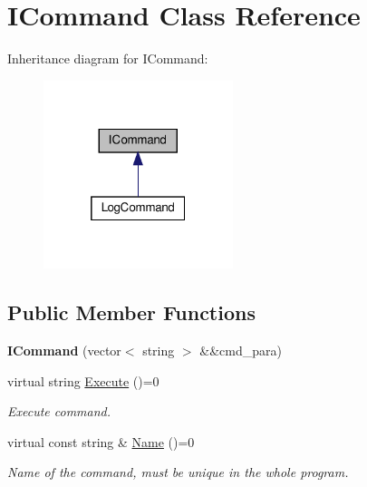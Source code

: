 \hypertarget{classICommand}{}\section{I\+Command Class Reference}
\label{classICommand}


Inheritance diagram for I\+Command\+:\nopagebreak
\begin{figure}[H]
\begin{center}
\leavevmode
\includegraphics[width=157pt]{classICommand__inherit__graph}
\end{center}
\end{figure}
\subsection*{Public Member Functions}
\begin{DoxyCompactItemize}
\item 
\mbox{\label{classICommand_aededc038ba0930a4ae3cad96aa92785e}} 
{\bfseries I\+Command} (vector$<$ string $>$ \&\&cmd\+\_\+para)
\item 
\mbox{\label{classICommand_ad1f533ad87b90bf6aa322d141126441f}} 
virtual string \hyperlink{classICommand_ad1f533ad87b90bf6aa322d141126441f}{Execute} ()=0
\begin{DoxyCompactList}\small\item\em Execute command. \end{DoxyCompactList}\item 
virtual const string \& \hyperlink{classICommand_aebdd4993acbba78855f1ace503786dfc}{Name} ()=0
\begin{DoxyCompactList}\small\item\em Name of the command, must be unique in the whole program. \end{DoxyCompactList}\end{DoxyCompactItemize}
